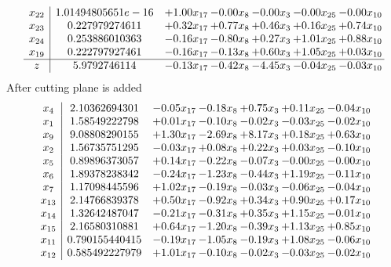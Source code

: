 \documentclass[8pt]{article}
\begin{document}
\[\begin{array}{c| c c@{\hskip 2pt} c@{\hskip 2pt} c@{\hskip 2pt} c@{\hskip 2pt} c@{\hskip 2pt} }
 x_{22}   &  1.01494805651e-16 & +  1.00 x_{17} & -0.00 x_{8} & -0.00 x_{3} & -0.00 x_{25} & -0.00 x_{10}\\
 x_{23}   &  0.227979274611 & +  0.32 x_{17} & +  0.77 x_{8} & +  0.46 x_{3} & +  0.16 x_{25} & +  0.74 x_{10}\\
 x_{24}   &  0.253886010363 & -0.16 x_{17} & -0.80 x_{8} & +  0.27 x_{3} & +  1.01 x_{25} & +  0.88 x_{10}\\
 x_{19}   &  0.222797927461 & -0.16 x_{17} & -0.13 x_{8} & +  0.60 x_{3} & +  1.05 x_{25} & +  0.03 x_{10}\\
\hline
z    &  5.9792746114 & -0.13 x_{17} & -0.42 x_{8} & -4.45 x_{3} & -0.04 x_{25} & -0.03 x_{10}\\
\end{array}\]
 After cutting plane is added 
\[\begin{array}{c| c c@{\hskip 2pt} c@{\hskip 2pt} c@{\hskip 2pt} c@{\hskip 2pt} c@{\hskip 2pt} }
 x_{4}   &  2.10362694301 & -0.05 x_{17} & -0.18 x_{8} & +  0.75 x_{3} & +  0.11 x_{25} & -0.04 x_{10}\\
 x_{1}   &  1.58549222798 & +  0.01 x_{17} & -0.10 x_{8} & -0.02 x_{3} & -0.03 x_{25} & -0.02 x_{10}\\
 x_{9}   &  9.08808290155 & +  1.30 x_{17} & -2.69 x_{8} & +  8.17 x_{3} & +  0.18 x_{25} & +  0.63 x_{10}\\
 x_{2}   &  1.56735751295 & -0.03 x_{17} & +  0.08 x_{8} & +  0.22 x_{3} & +  0.03 x_{25} & -0.10 x_{10}\\
 x_{5}   &  0.89896373057 & +  0.14 x_{17} & -0.22 x_{8} & -0.07 x_{3} & -0.00 x_{25} & -0.00 x_{10}\\
 x_{6}   &  1.89378238342 & -0.24 x_{17} & -1.23 x_{8} & -0.44 x_{3} & +  1.19 x_{25} & -0.11 x_{10}\\
 x_{7}   &  1.17098445596 & +  1.02 x_{17} & -0.19 x_{8} & -0.03 x_{3} & -0.06 x_{25} & -0.04 x_{10}\\
 x_{13}   &  2.14766839378 & +  0.50 x_{17} & -0.92 x_{8} & +  0.34 x_{3} & +  0.90 x_{25} & +  0.17 x_{10}\\
 x_{14}   &  1.32642487047 & -0.21 x_{17} & -0.31 x_{8} & +  0.35 x_{3} & +  1.15 x_{25} & -0.01 x_{10}\\
 x_{15}   &  2.16580310881 & +  0.64 x_{17} & -1.20 x_{8} & -0.39 x_{3} & +  1.13 x_{25} & +  0.85 x_{10}\\
 x_{11}   &  0.790155440415 & -0.19 x_{17} & -1.05 x_{8} & -0.19 x_{3} & +  1.08 x_{25} & -0.06 x_{10}\\
 x_{12}   &  0.585492227979 & +  1.01 x_{17} & -0.10 x_{8} & -0.02 x_{3} & -0.03 x_{25} & -0.02 x_{10}\\

\end{array}\]
\end{document}
